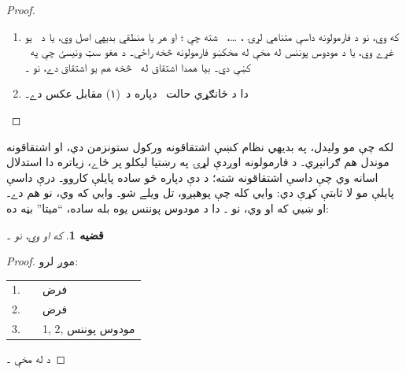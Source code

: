 \documentclass[12pt,a4paper,oneside]{report}
\makeatletter
\newcommand{\olfileid}[3]{\gdef\pspart{#1}\gdef\pschapter{#2}\gdef\pssection{#3}}
\gdef\pspart{#2}\gdef\pschapter{#3}\gdef\pssection{}%
\newcommand{\ollabel}[1]{\label{\pspart:\pschapter:\pssection:#1}}
\newtheorem{prop}[thm]{قضيه}
\theoremstyle{definition}
\newenvironment{derivation}{%
  \par\smallskip\begin{LTR}\begin{tabular}{@{}rll@{}}}
  {\end{tabular}\end{LTR}\par\smallskip}
\makeatother
\begin{document}
\label{olpseg:OLP-0118-B022:start}
\begin{proof}
  \begin{enumerate}
    \item که  وي، نو د فارمولونه داسې متناهي
      لړۍ ، \dots،~ شته چې ؛ او هر
       يا منطقي بديهي اصل وي، يا د~\LR{$\Gamma$} يو غړے
      وي، يا د مودوس پوننس له مخې له مخکښو فارمولونه څخه راځي۔
       د هغو  سټ ونيسئ چې په~\LR{$\Gamma$} کښې دي۔ بيا
      همدا اشتقاق له~ څخه هم يو اشتقاق
      دے، نو ۔
    \item دا د ځانګړي حالت~ دپاره د~(۱) مقابل
      عکس دے۔
\end{enumerate}
\end{proof}
\label{olpseg:OLP-0118-B022:end}

\label{olpseg:OLP-0119-B005:start}
\olfileid{fol}{axd}{ded}
\label{olpseg:OLP-0119-B005:end}

\label{olpseg:OLP-0119-B006:start}
\label{olpseg:OLP-0119-B006:end}

\label{olpseg:OLP-0119-B007:start}
لکه چې مو وليدل، په بديهي نظام کښې اشتقاقونه ورکول ستونزمن
دي، او اشتقاقونه موندل هم ګرانېږي۔ د فارمولونه اوږدې لړۍ
په رښتيا ليکلو پر ځاے، زياتره دا استدلال اسانه وي چې داسې
اشتقاقونه شته؛ د دې دپاره څو ساده پايلې کاروو۔ درې داسې پايلې
مو لا ثابتې کړې دي:  وايي کله چې
 پوهېږو، تل  ويلے شو۔
 وايي که  وي، نو
 هم دے۔ او
 ښيي که  او
 وي، نو ۔ دا د مودوس پوننس يوه
بله ساده، ``ميتا'' بڼه ده:
\label{olpseg:OLP-0119-B007:end}

\label{olpseg:OLP-0119-B008:start}
\begin{prop}
  \ollabel{prop:mp} که  او
   وي، نو ۔
\end{prop}
\label{olpseg:OLP-0119-B008:end}

\label{olpseg:OLP-0119-B009:start}
\begin{proof}
  موږ  لرو:
  \begin{derivation}
    1. & \LR{$!A$} & فرض\\
    2. & \LR{$!A \lif !B$} & فرض\\
    3. & \LR{$!B$} & 1, 2, مودوس پوننس
  \end{derivation}
  د  له مخې ۔
\end{proof}
\label{olpseg:OLP-0119-B009:end}
\end{document}
